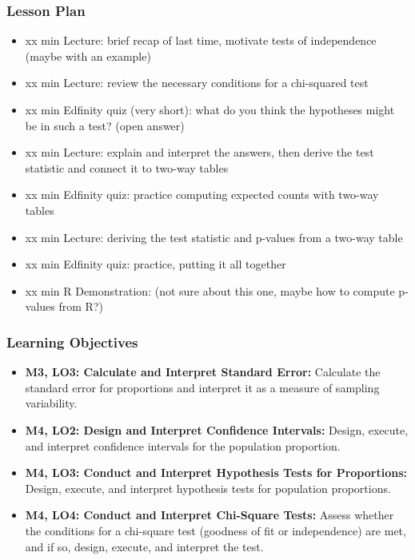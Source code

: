 \begin{frame}
    \frametitle{Lesson Plan}
    \begin{itemize}
        \item xx min Lecture: brief recap of last time, motivate tests of independence (maybe with an example)
        \item xx min Lecture: review the necessary conditions for a chi-squared test
        \item xx min Edfinity quiz (very short): what do you think the hypotheses might be in such a test? (open answer)
        \item xx min Lecture: explain and interpret the answers, then derive the test statistic and connect it to two-way tables
        \item xx min Edfinity quiz: practice computing expected counts with two-way tables
        \item xx min Lecture: deriving the test statistic and p-values from a two-way table
        \item xx min Edfinity quiz: practice, putting it all together
        \item xx min R Demonstration: (not sure about this one, maybe how to compute p-values from R?)
    \end{itemize}
\end{frame}
            
\begin{frame}
    \frametitle{Learning Objectives}
    \begin{itemize}
        \item \textbf{M3, LO3: Calculate and Interpret Standard Error:} Calculate the standard error for proportions and interpret it as a measure of sampling variability.
        \item \textbf{M4, LO2: Design and Interpret Confidence Intervals:} Design, execute, and interpret confidence intervals for the population proportion.
        \item \textbf{M4, LO3: Conduct and Interpret Hypothesis Tests for Proportions:} Design, execute, and interpret hypothesis tests for population proportions.
        \item \textbf{M4, LO4: Conduct and Interpret Chi-Square Tests:} Assess whether the conditions for a chi-square test (goodness of fit or independence) are met, and if so, design, execute, and interpret the test.
    \end{itemize}
\end{frame}
    
